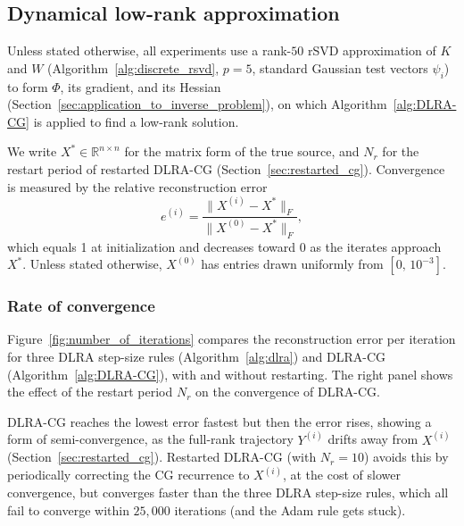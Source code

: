 \subsection{Dynamical low-rank approximation}
Unless stated otherwise, all experiments use a rank-$50$ rSVD approximation of $K$ and $W$ (Algorithm~\ref{alg:discrete_rsvd}, $p = 5$, standard Gaussian test vectors $\psi_i$) to form $\Phi$, its gradient, and its Hessian (Section~\ref{sec:application_to_inverse_problem}), on which Algorithm~\ref{alg:DLRA-CG} is applied to find a low-rank solution.

We write $X^* \in \mathbb{R}^{n \times n}$ for the matrix form of the true source, and $N_r$ for the restart period of restarted DLRA-CG (Section~\ref{sec:restarted_cg}). Convergence is measured by the relative reconstruction error
\begin{equation*}
    e^{(i)} = \frac{\|X^{(i)} - X^*\|_F}{\|X^{(0)} - X^*\|_F},
\end{equation*}
which equals 1 at initialization and decreases toward 0 as the iterates approach $X^*$. Unless stated otherwise, $X^{(0)}$ has entries drawn uniformly from $[0,\,10^{-3}]$.


\subsubsection{Rate of convergence}\label{sec:rate_of_convergence}


Figure~\ref{fig:number_of_iterations} compares the reconstruction error per iteration for three DLRA step-size rules (Algorithm~\ref{alg:dlra}) and DLRA-CG (Algorithm~\ref{alg:DLRA-CG}), with and without restarting. The right panel shows the effect of the restart period $N_r$ on the convergence of DLRA-CG.

DLRA-CG reaches the lowest error fastest but then the error rises, showing a form of semi-convergence, as the full-rank trajectory $Y^{(i)}$ drifts away from $X^{(i)}$ (Section~\ref{sec:restarted_cg}). Restarted DLRA-CG (with $N_r = 10$) avoids this by periodically correcting the CG recurrence to $X^{(i)}$, at the cost of slower convergence, but converges faster than the three DLRA step-size rules, which all fail to converge within $25{,}000$ iterations (and the Adam
rule gets stuck).

